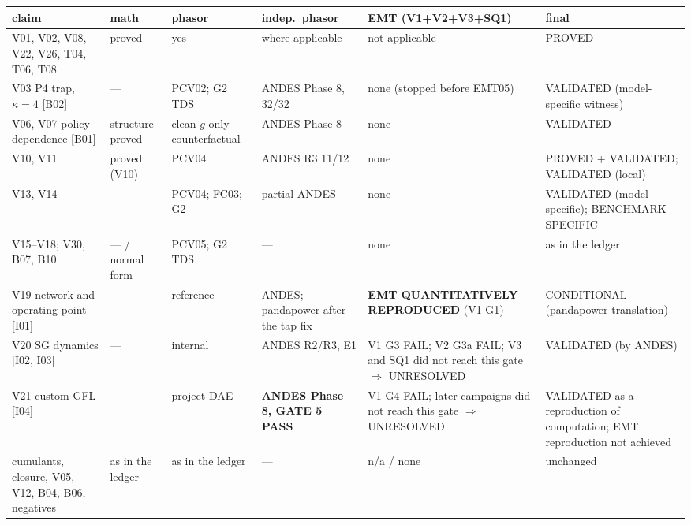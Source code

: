 \documentclass[10pt,a4paper]{article}
\begin{document}
{\small
\begin{longtable}{@{}L{2.8cm}L{1.6cm}L{2.0cm}L{2.3cm}L{3.2cm}L{2.9cm}@{}}
\toprule
claim & math & phasor & indep.\ phasor & EMT (V1+V2+V3+SQ1) & final\\
\midrule\endhead
V01, V02, V08, V22, V26, T04, T06, T08 & proved & yes & where applicable & not applicable & PROVED\\
V03 P4 trap, $\kappa=4$ [B02] & --- & PCV02; G2 TDS & ANDES Phase 8, 32/32 & none (stopped before EMT05) & VALIDATED (model-specific witness)\\
V06, V07 policy dependence [B01] & structure proved & clean $g$-only counterfactual & ANDES Phase 8 & none & VALIDATED\\
V10, V11 & proved (V10) & PCV04 & ANDES R3 11/12 & none & PROVED + VALIDATED; VALIDATED (local)\\
V13, V14 & --- & PCV04; FC03; G2 & partial ANDES & none & VALIDATED (model-specific); BENCHMARK-SPECIFIC\\
V15--V18; V30, B07, B10 & --- / normal form & PCV05; G2 TDS & --- & none & as in the ledger\\
V19 network and operating point [I01] & --- & reference & ANDES; pandapower after the tap fix & \textbf{EMT QUANTITATIVELY REPRODUCED} (V1 G1) & CONDITIONAL (pandapower translation)\\
V20 SG dynamics [I02, I03] & --- & internal & ANDES R2/R3, E1 & V1 G3 FAIL; V2 G3a FAIL; V3 and SQ1 did not reach this gate $\Rightarrow$ UNRESOLVED & VALIDATED (by ANDES)\\
V21 custom GFL [I04] & --- & project DAE & \textbf{ANDES Phase 8, GATE 5 PASS} & V1 G4 FAIL; later campaigns did not reach this gate $\Rightarrow$ UNRESOLVED & VALIDATED as a reproduction of computation; EMT reproduction not achieved\\
cumulants, closure, V05, V12, B04, B06, negatives & as in the ledger & as in the ledger & --- & n/a / none & unchanged\\
\bottomrule
\end{longtable}}
\end{document}
